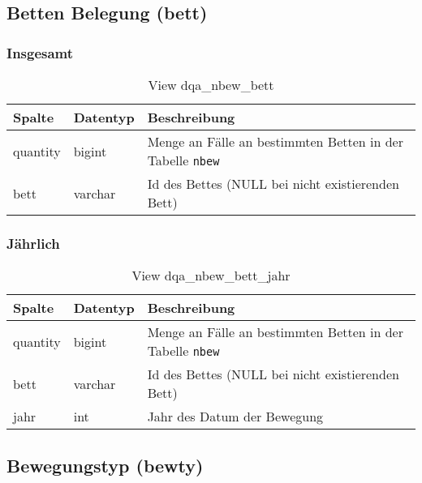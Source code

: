 \newpage

\subsection{Betten Belegung (bett)} \label{subsec:bett}

\subsubsection{Insgesamt} \label{subsubsec:bettI}

\begin{table}[ht]
	\centering   
	\caption{View dqa\_nbew\_bett}
	\label{tab:beweBettAll}
	\begin{tabular}{||l|l|p{10cm}||}   		
		\hline
		Spalte & Datentyp & Beschreibung \\ [0.5ex]
		\hline\hline
		quantity & bigint & Menge an Fälle an bestimmten Betten in der Tabelle \texttt{nbew} \\
		\hline
		bett & varchar & Id des Bettes (NULL bei nicht existierenden Bett)\\
		\hline
		
	\end{tabular}
\end{table}

\subsubsection{Jährlich} \label{subsubsec:bettJ}

\begin{table}[ht]
	\centering   
	\caption{View dqa\_nbew\_bett\_jahr}
	\label{tab:beweBettJahr}
	\begin{tabular}{||l|l|p{10cm}||}   		
		\hline
		Spalte & Datentyp & Beschreibung \\ [0.5ex]
		\hline\hline
		quantity & bigint & Menge an Fälle an bestimmten Betten in der Tabelle \texttt{nbew} \\
		\hline
		bett & varchar &  Id des Bettes (NULL bei nicht existierenden Bett) \\
		\hline
		jahr & int &  Jahr des Datum der Bewegung \\
		\hline		
	\end{tabular}
\end{table}

\subsection{Bewegungstyp (bewty)} \label{subsec:bewtyp}

